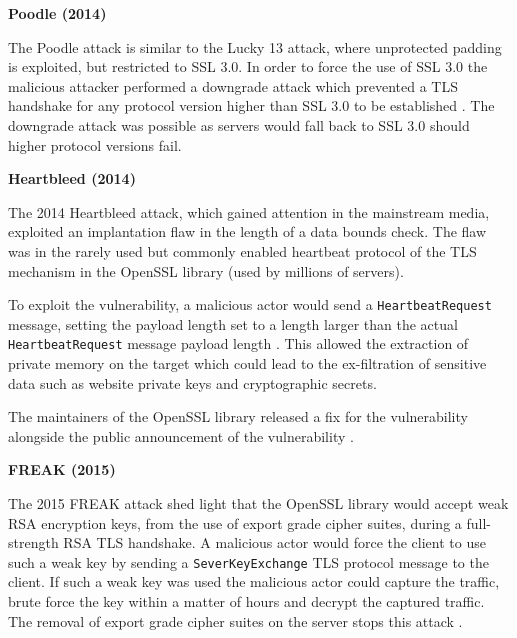 \documentclass{mscreport}
\begin{document}
\vspace{0.6cm} \noindent
\textbf{Poodle (2014)}

\vspace{0.2cm} \noindent
The Poodle attack is similar to the Lucky 13 attack, where unprotected padding is exploited, but restricted to SSL 3.0. In order to force the use of SSL 3.0 the malicious attacker performed a downgrade attack which prevented a TLS handshake for any protocol version higher than SSL 3.0 to be established \cite{Ristic2017-aj,Al_Fardan2013-sw}. The downgrade attack was possible as servers would fall back to SSL 3.0 should higher protocol versions fail.


\vspace{0.6cm} \noindent
\textbf{Heartbleed (2014)}

\vspace{0.2cm} \noindent
The 2014 Heartbleed attack, which gained attention in the mainstream media, exploited an implantation flaw in the length of a data bounds check. The flaw was in the rarely used but commonly enabled heartbeat protocol \cite{Durumeric2014-yj} of the TLS mechanism in the OpenSSL library (used by millions of servers).

\vspace{0.2cm} \noindent
To exploit the vulnerability, a malicious actor would send a \texttt{HeartbeatRequest} message, setting the payload length set to a length larger than the actual \texttt{HeartbeatRequest} message payload length \cite{Durumeric2014-yj}. This allowed the extraction of private memory on the target which could lead to the ex-filtration of sensitive data such as website private keys and cryptographic secrets.

\vspace{0.3cm} \noindent
The maintainers of the OpenSSL library released a fix for the vulnerability alongside the public announcement of the vulnerability \cite{Durumeric2014-yj}.


\vspace{0.6cm} \noindent
\textbf{FREAK (2015)}

\vspace{0.2cm} \noindent
The 2015 FREAK attack shed light that the OpenSSL library would accept weak RSA encryption keys, from the use of export grade cipher suites, during a full-strength RSA TLS handshake. A malicious actor would force the client to use such a weak key by sending a \texttt{SeverKeyExchange} TLS protocol message to the client. If such a weak key was used the malicious actor could capture the traffic, brute force the key within a matter of hours and decrypt the captured traffic. The removal of export grade cipher suites on the server stops this attack \cite{Ristic2017-aj,Beurdouche2015-ga}.
\end{document}
